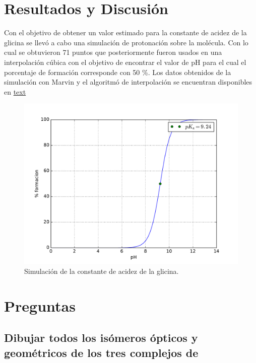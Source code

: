 \documentclass[fleqn,10pt]{SelfArx} %
\begin{document}
	\section{Resultados y Discusi\'on}
	Con el objetivo de obtener un valor estimado para la constante de acidez de la glicina se llev\'o a cabo una simulaci\'on de protonaci\'on sobre la mol\'ecula. Con lo cual se obtuvieron 71 puntos que posteriormente fueron usados en una interpolaci\'on c\'ubica con el objetivo de encontrar el valor de pH para el cual el porcentaje de formaci\'on corresponde con 50 \%. Los datos obtenidos de la simulaci\'on con Marvin y el algoritm\'o de interpolaci\'on se encuentran disponibles en \href{www}{text}
	\begin{figure}[h]
		\centering
		\includegraphics[width=\linewidth]{images/pka_sim.pdf}
		\caption{Simulaci\'on de la constante de acidez de la glicina.}
	\end{figure}
	
	\section{Preguntas}
	\subsection{Dibujar todos los is\'omeros \'opticos y geom\'etricos de los tres complejos de}
	\subsubsection{\ce{[Ni(Gly^-)]^+}}
	\subsubsection{\ce{[Ni(Gly^-)_2]}}
\end{document}
